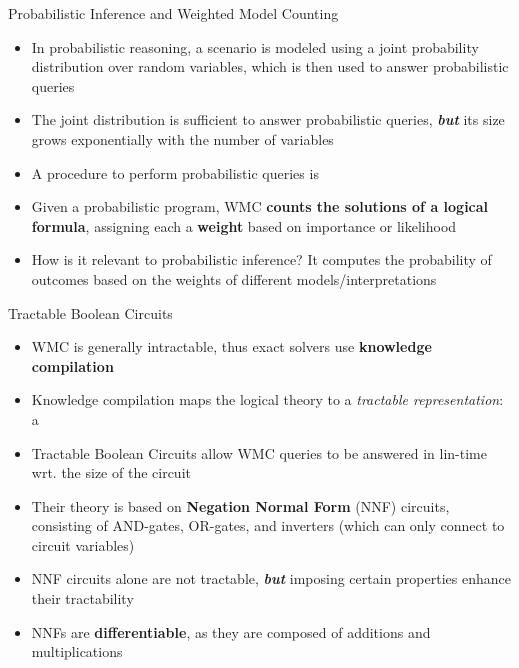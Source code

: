 \documentclass[10pt, aspectratio=169]{beamer}
\begin{document}
\begin{frame}{Probabilistic Inference and Weighted Model Counting}
    \begin{itemize}
        \setlength{\itemsep}{11pt}
        \item In probabilistic reasoning, a scenario is modeled using a joint probability distribution over random variables, which is then used to answer probabilistic queries %
        \item The joint distribution is sufficient to answer probabilistic queries, \textbf{\textit{but}} its size grows exponentially with the number of variables
        \item A procedure to perform probabilistic queries is 
        \item Given a probabilistic program, WMC \textbf{counts the solutions of a logical formula}, assigning each a \textbf{weight} based on importance or likelihood
        \item \textcolor{umBlueLighter}{How is it relevant to probabilistic inference?} It computes the probability of outcomes based on the weights of different models/interpretations
    \end{itemize}
\end{frame}

\begin{frame}{Tractable Boolean Circuits}
    \begin{itemize}
        \setlength{\itemsep}{12pt}
        \item WMC is generally intractable, thus exact solvers use \textbf{knowledge compilation}
        \item Knowledge compilation maps the logical theory to a \textit{tractable representation}: a 
        \item \textcolor{umBlueLighter}{Tractable Boolean Circuits} allow WMC queries to be answered in lin-time wrt. the size of the circuit 
        \item Their theory is based on \textbf{Negation Normal Form} (NNF) circuits, consisting of AND-gates, OR-gates, and inverters (which can only connect to circuit variables)
        \item  NNF circuits alone are not tractable, \textbf{\textit{but}} imposing certain properties enhance their tractability
        \item NNFs are \textbf{differentiable}, as they are composed of additions and multiplications
    \end{itemize}
\end{frame}
\end{document}

